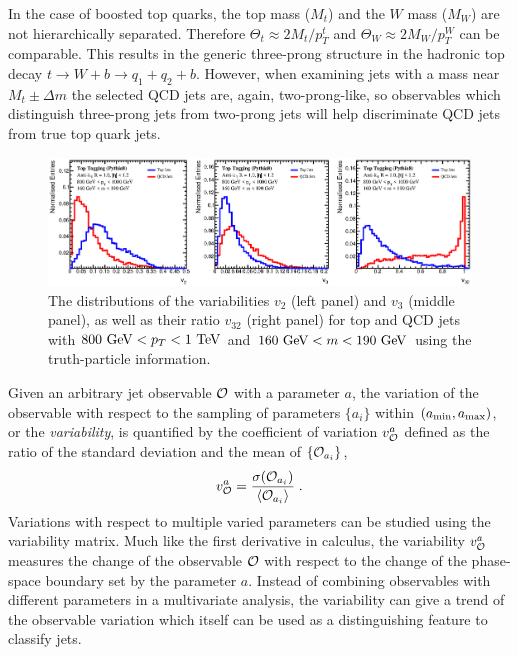 \documentclass[aps,prl,floatfix,preprintnumbers,twocolumn,groupedaddress,nofootinbib]{revtex4-1}
\newcommand{\be}{\begin{equation}}
\newcommand{\ee}{\end{equation}}
\begin{document}
In the case of boosted top quarks, the top mass ($M_t$) and the $W$ mass ($M_W$) are not hierarchically separated. Therefore $\Theta_t \approx 2M_t/p_T^t$ and $\Theta_W \approx 2M_W/p_T^W$ can be comparable. This results in the generic three-prong structure in the hadronic top decay $t\rightarrow W+b \rightarrow q_1+q_2+b$. However, when examining jets with a mass near $M_t\pm \Delta m$ the selected QCD jets are, again, two-prong-like, so observables which distinguish three-prong jets from two-prong jets will help discriminate QCD jets from true top quark jets.

\begin{figure}
    \includegraphics[width=2\columnwidth]{plots/Top_vs_high.eps}
    \caption{The distributions of the variabilities $v_2$ (left panel) and $v_3$ (middle panel), as well as their ratio $v_{32}$ (right panel) for top and QCD jets with $800~{\rm GeV} < p_T < 1~{\rm TeV}$ and $160~{\rm GeV} < m < 190~{\rm GeV}$ using the truth-particle information.}
\label{v42}
\end{figure}

Given an arbitrary jet observable $\cal O$ with a parameter $a$,
the variation of the observable with respect to the sampling of parameters $\{a_i\}$ within $(a_{\rm min},a_{\rm max})$, or the {\sl variability}, is quantified by the coefficient of variation $v_{\cal O}^a$ defined as the ratio of the standard deviation and the mean of $\{{\cal O}_{a_i}\}$,
\be
    v_{\cal O}^a = \frac{\sigma({\cal O}_{a_i})}{\langle {\cal O}_{a_i}\rangle}\;.
\ee
Variations with respect to multiple varied parameters can be studied using the variability matrix. Much like the first derivative in calculus, the variability $v_{\cal O}^a$ measures the change of the observable $\cal O$ with respect to the change of the phase-space boundary set by the parameter $a$. Instead of combining observables with different parameters in a multivariate analysis, the variability can give a trend of the observable variation which itself can be used as a distinguishing feature to classify jets.
\end{document}
